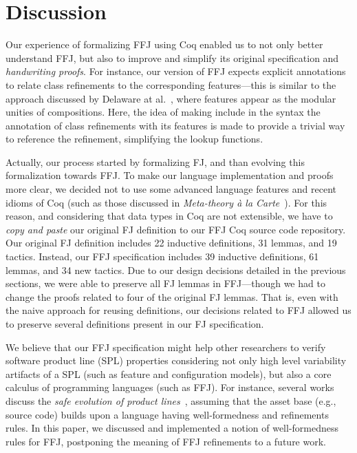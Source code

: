 \chapter{Discussion}\label{seq:impl}

Our experience of formalizing \gls{FFJ} 
using Coq enabled us to 
not only better understand \gls{FFJ}, but also to improve and 
simplify its original specification and \emph{handwriting 
proofs}. For instance, our version of \gls{FFJ} expects 
explicit annotations to relate class refinements to the 
corresponding features---this is similar to the 
approach discussed by Delaware at al.~\cite{delaware:fse-2009}, 
where features appear as the modular unities of compositions. 
Here, the idea of making include in the syntax the annotation 
of class refinements with its features is made to provide a trivial way to 
reference the refinement, simplifying the lookup functions.

Actually, our process started by formalizing \gls{FJ}, 
and than evolving this formalization towards \gls{FFJ}. 
To make our language implementation and proofs more clear, 
we decided not to use some advanced language features 
and recent idioms of Coq (such as those discussed in \emph{Meta-theory \`{a} la Carte}~\cite{delaware:popl2013}). 
For this reason, and considering that data types in Coq are not extensible, 
we have to \emph{copy and paste} our original \gls{FJ} definition 
to our \gls{FFJ} Coq source code repository. Our original \gls{FJ} 
definition includes 22 inductive definitions, 31 lemmas, and 
19 tactics. Instead, our \gls{FFJ} specification includes 
39 inductive definitions, 61 lemmas, and 34 new tactics. Due to our 
design decisions detailed in the previous sections, 
we were able to preserve all \gls{FJ} lemmas in \gls{FFJ}---though 
we had to change the proofs related to four of the original \gls{FJ} 
lemmas. That is, even with the naive approach for reusing 
definitions, our decisions related to \gls{FFJ} 
allowed us to preserve several definitions present 
in our \gls{FJ} specification. 

We believe that our \gls{FFJ} specification might 
help other researchers to verify software product 
line (SPL) properties considering not only high level 
variability artifacts of a SPL (such as feature and configuration 
models), but also a core calculus of programming 
languages (such as \gls{FFJ}). For instance, 
several works discuss the \emph{safe evolution 
of product lines}~\cite{}, assuming that the asset 
base (e.g., source code) builds upon a 
language having well-formedness and 
refinements rules. In this paper, we discussed and implemented a 
notion of well-formedness rules for \gls{FFJ}, postponing 
the meaning of \gls{FFJ} refinements to a future work.  

 

